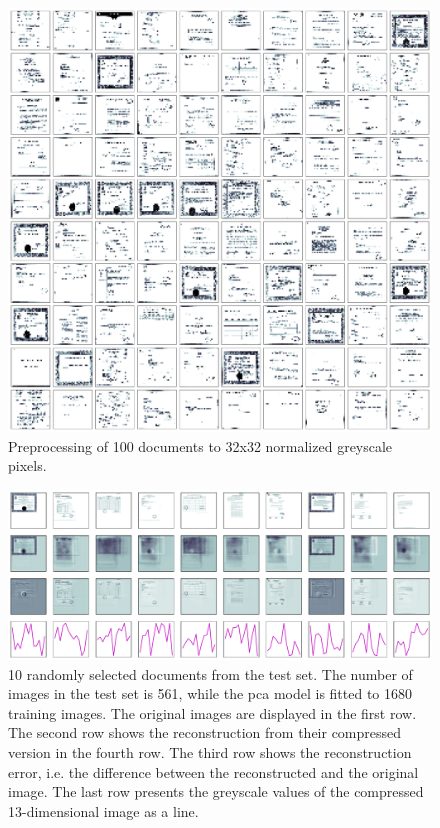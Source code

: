 \begin{figure}[!htb] %
    \centering
    \includegraphics[width=1\textwidth]{images/OPTICS/32x32/preprocessed_docs.pdf}
    \caption[Preprocessing to 32x32 normalized greyscale pixels]{Preprocessing of 100 documents to 32x32 normalized greyscale pixels.
    }
    \label{fig:preprocessed_docs_32x32}
\end{figure}


\begin{figure}[!htb] %
    \centering
    \includegraphics[width=1\textwidth]{images/Eigendocs/transformation/eigendocs.pdf}
    \caption[Preprocessing 10 randomly selected documents from the test set]{10 randomly selected documents from the test set.
    The number of images in the test set is 561, while the \ac{pca} model is fitted to 1680 training images.
    The original images are displayed in the first row.
    The second row shows the reconstruction from their compressed version in the fourth row.
    The third row shows the reconstruction error, i.e. the difference between the reconstructed and the original image.
    The last row presents the greyscale values of the compressed 13-dimensional image as a line.
    }
    \label{fig:preprocessed_docs_eigendocs}
\end{figure}

